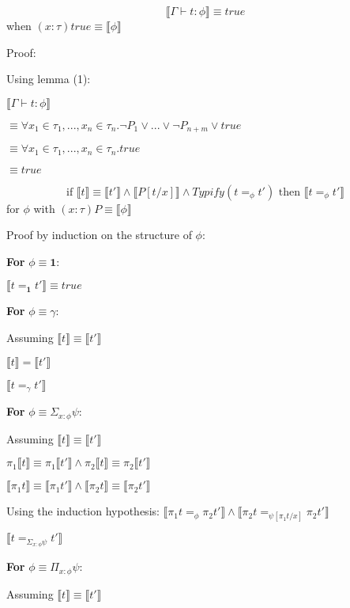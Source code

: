 \documentclass[12pt,a4paper,titlepage]{article}
\newcommand{\typify}{\textit{Typify}}
\newcommand{\bbrackets}[1]{\llbracket #1 \rrbracket}
\begin{document}
    \begin{equation}
        \bbrackets{\Gamma \vdash t: \phi} \equiv true
    \end{equation}
    when $(x: \tau)true \equiv \bbrackets{\phi}$

    Proof:

    Using lemma (1):

    $\bbrackets{\Gamma \vdash t: \phi}$

    $\equiv \forall x_1 \in \tau_1, ..., x_n \in \tau_n . \neg P_1 \lor ... \lor \neg P_{n+m} \lor true$

    $\equiv \forall x_1 \in \tau_1, ..., x_n \in \tau_n . true$

    $\equiv true$

    \begin{equation}
        \text{if } \bbrackets{t} \equiv \bbrackets{t'} \land \bbrackets{P[t/x]} \land \typify (t =_\phi t') \text{ then } \bbrackets{t =_\phi t'}
    \end{equation}
    for $\phi$ with $(x: \tau)P \equiv \bbrackets{\phi}$

    Proof by induction on the structure of $\phi$:

    \textbf{For} $\phi \equiv \textbf{1}$:

    $\bbrackets{t =_\textbf{1} t'} \equiv true$

    \textbf{For} $\phi \equiv \gamma$:

    Assuming $\bbrackets{t} \equiv \bbrackets{t'}$

    $\bbrackets{t} = \bbrackets{t'}$

    $\bbrackets{t =_\gamma t'}$

    \textbf{For} $\phi \equiv \Sigma_{x:\phi} \psi$:

    Assuming $\bbrackets{t} \equiv \bbrackets{t'}$

    $\pi_1 \bbrackets{t} \equiv \pi_1 \bbrackets{t'} \land \pi_2 \bbrackets{t} \equiv \pi_2 \bbrackets{t'}$

    $\bbrackets{\pi_1 t} \equiv \bbrackets{\pi_1 t'} \land \bbrackets{\pi_2 t} \equiv \bbrackets{\pi_2 t'}$

    Using the induction hypothesis: $\bbrackets{\pi_1 t =_\phi \pi_2 t'} \land \bbrackets{\pi_2 t =_{\psi[\pi_1 t / x]} \pi_2 t'}$

    $\bbrackets{t =_{\Sigma_{x:\phi} \psi} t'}$

    \textbf{For} $\phi \equiv \Pi_{x:\phi} \psi$:

    Assuming $\bbrackets{t} \equiv \bbrackets{t'}$
\end{document}
